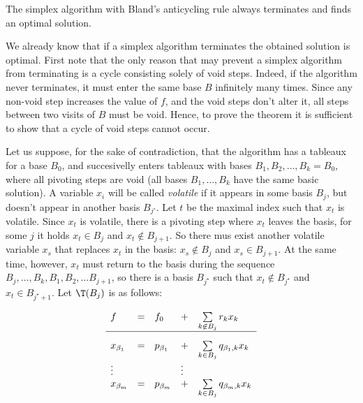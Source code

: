 \begin{veta}
  The simplex algorithm with Bland's anticycling rule always terminates and finds an optimal solution.
\end{veta}

\begin{dokaz}
We already know that if a simplex algorithm terminates the obtained solution is optimal. First note that
the only reason that may prevent a simplex algorithm from terminating is a cycle consisting solely of void steps.
Indeed, if the algorithm never terminates, it must enter the same base $B$ infinitely many times. Since any non-void
step increases the value of $f$, and the void steps don't alter it, all steps between two visits of $B$ must be void.
Hence, to prove the theorem it is sufficient to show that a cycle of void steps cannot occur.


\noindent
Let us suppose, for the sake of contradiction, that the algorithm has a tableaux for a base $B_0$, and 
succesivelly enters tableaux with bases $B_1,B_2,\ldots,B_k=B_0$, where all pivoting steps are void
(\ie all bases $B_1,\ldots,B_k$ have the same basic solution). A variable $x_i$ will be called {\em volatile}
if it appears in some basis $B_j$, but doesn't appear in another basis $B_{j'}$. Let $t$ be the maximal index such that
$x_t$ is volatile. Since $x_t$ is volatile, there is a pivoting step where $x_t$ leaves the basis, \ie
for some $j$ it holds $x_t\in B_j$ and $x_t\not\in B_{j+1}$.
So there mus exist another volatile variable $x_s$ that replaces $x_t$ in the basis:
$x_s\not\in B_j$ and $x_s\in B_{j+1}$. At the same time, however, $x_t$ must return to the basis during
the sequence $B_j,\ldots,B_k,B_1,B_2,\ldots B_{j+1}$, so there is a basis $B_{j^\star}$
such that  $x_t\not\in B_{j^\star}$ and $x_t\in B_{j^\star+1}$.
Let  $\T(B_j)$ is as follows:


\begin{equation}
  \label{LP:bland1}
\begin{array}{lllll}
  f & = & f_0 & + & \sum\limits_{k\not\in B_j} r_kx_k\\[2mm]\hline\rule{0mm}{4ex}
  x_{\beta_1} & = & p_{\beta_1} & + & \sum\limits_{k\in B_j}q_{\beta_1,k}x_k\\
    \vdots    &  & & \vdots\\
  x_{\beta_m} & = & p_{\beta_m} & + & \sum\limits_{k\in B_j}q_{\beta_m,k}x_k\\
\end{array}
\end{equation}


\end{dokaz}

